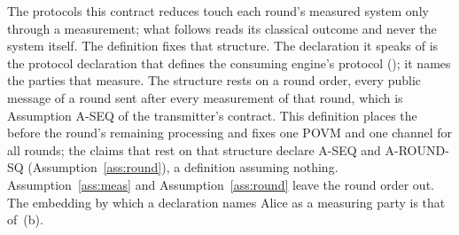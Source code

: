 
The protocols this contract reduces touch each round's measured system only
through a measurement; what follows reads its classical outcome and never the
system itself. The definition fixes that structure. The declaration it speaks
of is the protocol declaration that defines the consuming engine's protocol
(); it names the parties that measure. The
structure rests on a round order, every public message of a round sent after
every measurement of that round, which is Assumption A-SEQ of the
transmitter's contract. This definition places the
 before the round's remaining processing and fixes
one POVM and one channel for all rounds; the claims that rest on that
structure declare A-SEQ and A-ROUND-SQ (Assumption~\ref{ass:round}), a
definition assuming nothing. Assumption~\ref{ass:meas} and
Assumption~\ref{ass:round} leave the round order out. The embedding by which
a declaration names Alice as a measuring party is that of
\,(b).

